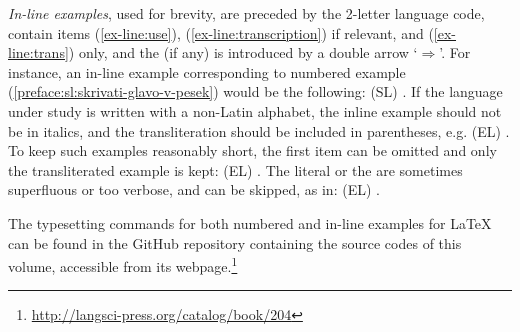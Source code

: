 \documentclass[output=paper,modfonts,]{langscibook}
\begin{document}




\emph{In-line examples}, used for brevity, are preceded by the 2-letter language code, contain items (\ref{ex-line:use}), (\ref{ex-line:transcription}) if relevant, and (\ref{ex-line:trans}) only, and the  (if any) is introduced by a double arrow `$\Rightarrow$'. For instance, an in-line example corresponding to numbered example (\ref{preface:sl:skrivati-glavo-v-pesek}) would be the following: (SL) . 
%
If the language under study is written with a non-Latin alphabet, the inline example should not be in italics, and the transliteration should be included in parentheses, e.g. (EL) . To keep such examples reasonably short, the first item can be omitted and only the transliterated example is kept: (EL) . 
%
The literal or the  are sometimes superfluous or too verbose, and can be skipped, as in:  (EL) . 

The typesetting commands for both numbered and in-line examples for {\LaTeX} can be found in the GitHub repository containing the source codes of this volume, accessible from its webpage.\footnote{\url{http://langsci-press.org/catalog/book/204}} %

\end{document}
